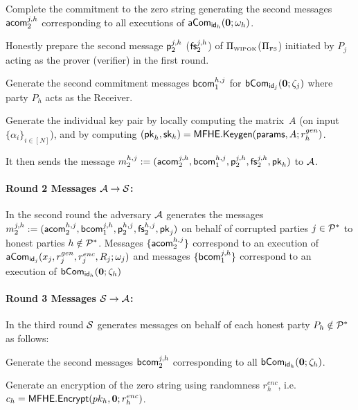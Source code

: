 \BE 
\item Complete the commitment to the zero string generating the second messages $\mathsf{acom}_2^{j,h}$ corresponding to all executions of $\mathsf{aCom}_{\mathsf{id}_h}({\bf 0};\omega_{h})$.

\item Honestly prepare the second message $\mathsf{p}_2^{j,h}$ ($\mathsf{fs}_2^{j,h}$) of $\Pi_{\scriptscriptstyle\mathrm{WIPOK}}$($\Pi_{\scriptscriptstyle\mathrm{FS}}$) initiated by $P_j$ acting as the prover (verifier) in the first round. 

\item Generate the second commitment messages ${\mathsf{bcom}}_1^{h,j}$ for $\mathsf{bCom}_{\mathsf{id}_j}({\bf 0};\zeta_j)$ where party $P_h$ acts as the Receiver.

\item Generate the individual key pair by locally computing the matrix~$A$ (on input $\{\alpha_i\}_{i\in[N]}$), and by  computing $({\mathsf{pk}}_h, {\mathsf{sk}}_h) = \mathsf{MFHE.Keygen}({\mathsf{params}}, A;r^{gen}_h)$.

\item It then sends the message $m^{h,j}_2:=(\mathsf{acom}^{j,h}_2, {\mathsf{bcom}}^{h,j}_1, \mathsf{p}^{j,h}_2, \mathsf{fs}^{j,h}_2,{\mathsf{pk}}_h)$ to ${\cal A}$.
\EE


\paragraph{Round 2 Messages ${\cal A} \rightarrow {\cal S}$:} In the second round the adversary ${\cal A}$ generates the messages $m^{j,h}_2:=(\mathsf{acom}^{h,j}_2, {\mathsf{bcom}}^{j,h}_1, \mathsf{p}^{h,j}_2, \mathsf{fs}^{h,j}_2,{\mathsf{pk}}_j)$ on behalf of corrupted parties $j\in{\cal P}^*$ to honest parties $h\notin{\cal P}^*$. Messages $\{\mathsf{acom}^{h,j}_2\}$ correspond to an execution of $\mathsf{aCom}_{\mathsf{id}_j}(x_j,r^{gen}_j,r^{enc}_j,R_j;\omega_{j})$ and messages $\{{\mathsf{bcom}}^{j,h}_1\}$ correspond to an execution of $\mathsf{bCom}_{\mathsf{id}_h}({\bf 0};\zeta_{h})$


\paragraph{Round 3 Messages ${\cal S} \rightarrow {\cal A}$:}  In the third round ${\cal S}$ generates messages on behalf of each honest party $P_h\notin{\cal P}^*$ as follows:

\BE
\item Generate the second messages ${\mathsf{bcom}}_2^{j,h}$ corresponding to all $\mathsf{bCom}_{\mathsf{id}_h}({\bf 0};\zeta_h)$. 

\item Generate an encryption of the zero string using randomness $r^{enc}_h$, i.e.  $c_h={\mathsf{MFHE.Encrypt}}(pk_h,{\bf 0};r^{enc}_h)$.

